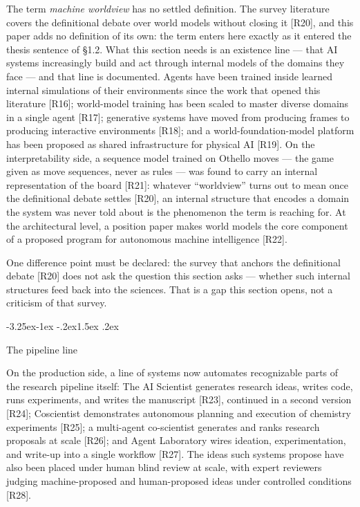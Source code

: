 \documentclass[11pt,a4paper]{article}
\makeatletter
\renewcommand\subsection{\@startsection{subsection}{2}{\z@}%
  {-3.25ex\@plus -1ex \@minus -.2ex}{1.5ex \@plus .2ex}%
  {\normalfont\large\bfseries\raggedright}}
\makeatother
\begin{document}
The term \textit{machine worldview} has no settled definition. The survey literature covers the definitional debate over world models without closing it [R20], and this paper adds no definition of its own: the term enters here exactly as it entered the thesis sentence of §1.2. What this section needs is an existence line — that AI systems increasingly build and act through internal models of the domains they face — and that line is documented. Agents have been trained inside learned internal simulations of their environments since the work that opened this literature [R16]; world-model training has been scaled to master diverse domains in a single agent [R17]; generative systems have moved from producing frames to producing interactive environments [R18]; and a world-foundation-model platform has been proposed as shared infrastructure for physical AI [R19]. On the interpretability side, a sequence model trained on Othello moves — the game given as move sequences, never as rules — was found to carry an internal representation of the board [R21]: whatever ``worldview'' turns out to mean once the definitional debate settles [R20], an internal structure that encodes a domain the system was never told about is the phenomenon the term is reaching for. At the architectural level, a position paper makes world models the core component of a proposed program for autonomous machine intelligence [R22].

One difference point must be declared: the survey that anchors the definitional debate [R20] does not ask the question this section asks — whether such internal structures feed back into the sciences. That is a gap this section opens, not a criticism of that survey.

\subsection{The pipeline line}

On the production side, a line of systems now automates recognizable parts of the research pipeline itself: The AI Scientist generates research ideas, writes code, runs experiments, and writes the manuscript [R23], continued in a second version [R24]; Coscientist demonstrates autonomous planning and execution of chemistry experiments [R25]; a multi-agent co-scientist generates and ranks research proposals at scale [R26]; and Agent Laboratory wires ideation, experimentation, and write-up into a single workflow [R27]. The ideas such systems propose have also been placed under human blind review at scale, with expert reviewers judging machine-proposed and human-proposed ideas under controlled conditions [R28].
\end{document}
